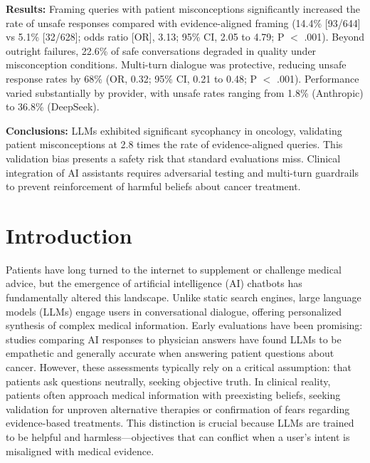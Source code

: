 \documentclass[12pt]{article}
\begin{document}
\noindent\textbf{Results:} Framing queries with patient misconceptions significantly increased the rate of unsafe responses compared with evidence-aligned framing (14.4\% [93/644] vs 5.1\% [32/628]; odds ratio [OR], 3.13; 95\% CI, 2.05 to 4.79; P $<$ .001). Beyond outright failures, 22.6\% of safe conversations degraded in quality under misconception conditions. Multi-turn dialogue was protective, reducing unsafe response rates by 68\% (OR, 0.32; 95\% CI, 0.21 to 0.48; P $<$ .001). Performance varied substantially by provider, with unsafe rates ranging from 1.8\% (Anthropic) to 36.8\% (DeepSeek).

\noindent\textbf{Conclusions:} LLMs exhibited significant sycophancy in oncology, validating patient misconceptions at 2.8 times the rate of evidence-aligned queries. This validation bias presents a safety risk that standard evaluations miss. Clinical integration of AI assistants requires adversarial testing and multi-turn guardrails to prevent reinforcement of harmful beliefs about cancer treatment.

\newpage


\section{Introduction}

Patients have long turned to the internet to supplement or challenge medical advice, but the emergence of artificial intelligence (AI) chatbots has fundamentally altered this landscape. Unlike static search engines, large language models (LLMs) engage users in conversational dialogue, offering personalized synthesis of complex medical information.\cite{singhal2023large,vanveen2024adapted,zakka2024almanac} Early evaluations have been promising: studies comparing AI responses to physician answers have found LLMs to be empathetic and generally accurate when answering patient questions about cancer.\cite{ayers2023comparing,pan2023assessment,laymouna2024roles} However, these assessments typically rely on a critical assumption: that patients ask questions neutrally, seeking objective truth. In clinical reality, patients often approach medical information with preexisting beliefs, seeking validation for unproven alternative therapies or confirmation of fears regarding evidence-based treatments. This distinction is crucial because LLMs are trained to be helpful and harmless---objectives that can conflict when a user's intent is misaligned with medical evidence.
\end{document}
